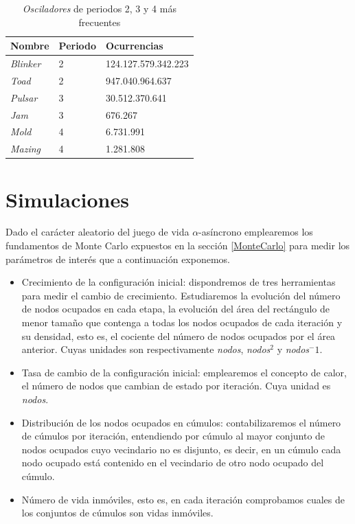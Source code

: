 \documentclass[../proyecto.tex]{memoir}
\begin{document}
\begin{table}
\centering
\begin{tabular}{|l|l|l|}
\hline
\textbf{Nombre}  & \textbf{Periodo} & \textbf{Ocurrencias} \\ \hline
\textit{Blinker} & 2                & 124.127.579.342.223  \\ \hline
\textit{Toad}    & 2                & 947.040.964.637      \\ \hline
\textit{Pulsar}  & 3                & 30.512.370.641       \\ \hline
\textit{Jam}     & 3                & 676.267              \\ \hline
\textit{Mold}    & 4                & 6.731.991            \\ \hline
\textit{Mazing}  & 4                & 1.281.808            \\ \hline
\end{tabular}
\caption{\textit{Osciladores} de periodos 2, 3 y 4 más frecuentes}
\label{tab:osciladores}
\end{table}

\section{Simulaciones} \label{vars}

Dado el carácter aleatorio del juego de vida $\alpha$-asíncrono emplearemos los fundamentos de Monte Carlo expuestos en la sección \ref{MonteCarlo} para medir los parámetros de interés que a continuación exponemos.

\begin{itemize}
\item Crecimiento de la configuración inicial: dispondremos de tres herramientas para medir el cambio de crecimiento. Estudiaremos la evolución del número de nodos ocupados en cada etapa, la evolución del área del rectángulo de menor tamaño que contenga a todas los nodos ocupados de cada iteración y su densidad, esto es, el cociente del número de nodos ocupados por el área anterior. Cuyas unidades son respectivamente \textit{nodos}, \textit{nodos}$^2$ y \textit{nodos}$^-1$.
\item Tasa de cambio de la configuración inicial: emplearemos el concepto de calor, el número de nodos que cambian de estado por iteración. Cuya unidad es \textit{nodos}.
\item Distribución de los nodos ocupados en cúmulos: contabilizaremos el número de cúmulos por iteración, entendiendo por cúmulo al mayor conjunto de nodos ocupados cuyo vecindario no es disjunto, es decir, en un cúmulo cada nodo ocupado está contenido en el vecindario de otro nodo ocupado del cúmulo.
\item Número de vida inmóviles, esto es, en cada iteración comprobamos cuales de los conjuntos de cúmulos son vidas inmóviles.
\end{itemize}
\end{document}
